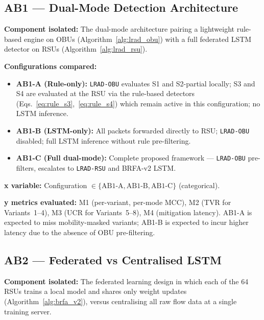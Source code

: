 \documentclass[12pt, a4paper]{report}
\begin{document}
{{%
\subsection{AB1 — Dual-Mode Detection Architecture}
\label{sec:ab1}

\textbf{Component isolated:}
The dual-mode architecture pairing a lightweight rule-based
engine on \ac{OBU}s (Algorithm~\ref{alg:lrad_obu}) with a
full federated \ac{LSTM} detector on \ac{RSU}s
(Algorithm~\ref{alg:lrad_rsu}).

\textbf{Configurations compared:}
\begin{itemize}
\item \textbf{AB1-A (Rule-only):}
\texttt{LRAD-OBU} evaluates S1 and S2-partial
locally; S3 and S4 are evaluated at the \ac{RSU}
via the rule-based detectors
(Eqs.~\ref{eq:rule_s3},~\ref{eq:rule_s4}) which
remain active in this configuration; no \ac{LSTM}
inference.

    \item \textbf{AB1-B (LSTM-only):} All packets forwarded
    directly to RSU; \texttt{LRAD-OBU} disabled; full
    \ac{LSTM} inference without rule pre-filtering.
    \item \textbf{AB1-C (Full dual-mode):} Complete proposed
    framework — \texttt{LRAD-OBU} pre-filters, escalates to
    \texttt{LRAD-RSU} and BRFA-v2 \ac{LSTM}.
\end{itemize}

\textbf{x variable:} Configuration
$\in \{\text{AB1-A}, \text{AB1-B}, \text{AB1-C}\}$ (categorical).

\textbf{y metrics evaluated:} M1 (per-variant, per-mode MCC),
M2 (TVR for Variants~1--4), M3 (UCR for Variants~5--8),
M4 (mitigation latency). AB1-A is expected to miss
mobility-masked variants; AB1-B is expected to incur higher
latency due to the absence of OBU pre-filtering.


\subsection{AB2 — Federated vs Centralised LSTM}
\label{sec:ab2}

\textbf{Component isolated:}
The federated learning design in which each of the 64
\ac{RSU}s trains a local model and shares only weight
updates (Algorithm~\ref{alg:brfa_v2}), versus centralising
all raw flow data at a single training server.

}}
\end{document}
